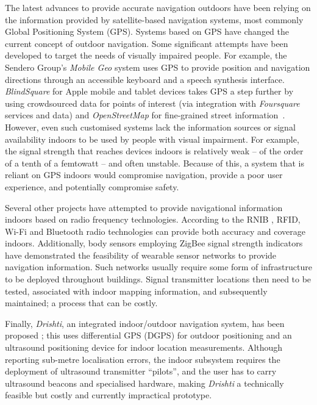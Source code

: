 The latest advances to provide accurate navigation outdoors have been relying on the information provided by satellite-based navigation systems, most commonly Global Positioning System (GPS). Systems based on GPS have changed the current concept of outdoor navigation. Some significant attempts have been developed to target the needs of visually impaired people. For example, the Sendero Group's  \textit{Mobile Geo} \citep{senderoSeeingEye} system uses GPS to provide position and navigation directions through an accessible keyboard and a speech synthesis interface. \textit{BlindSquare} for Apple mobile and tablet devices takes GPS a step further by using crowdsourced data for points of interest (via integration with \textit{Foursquare} services and data) and \textit{OpenStreetMap} for fine-grained street information~\citep{blindSquare}. However, even such customised systems lack the information sources or signal availability indoors to be used by people with visual impairment. For example, the signal strength that reaches devices indoors is relatively weak -- of the order of a tenth of a femtowatt \citep{warner2003gps} -- and often unstable.  Because of this, a system that is reliant on GPS indoors would compromise navigation, provide a poor user experience, and potentially compromise safety.

Several other projects have attempted to provide navigational information indoors based on radio frequency technologies. According to the RNIB \citep{Worsfold2010}, RFID, Wi-Fi and Bluetooth radio technologies can provide both accuracy and coverage indoors. Additionally, body sensors employing ZigBee signal strength indicators \citep{dong2012mapping} have demonstrated the feasibility of wearable sensor networks to provide navigation information. Such networks usually require some form of infrastructure to be deployed throughout buildings. Signal transmitter locations then need to be tested, associated with indoor mapping information, and subsequently maintained; a process that can be costly.

Finally, \textit{Drishti}, an integrated indoor/outdoor navigation system, has been proposed \citep{ran2004drishti}; this uses differential GPS (DGPS) for outdoor positioning and an ultrasound positioning device for indoor location measurements. Although reporting sub\--me\-tre localisation errors, the indoor subsystem requires the deployment of ultrasound transmitter ``pilots'', and the user has to carry ultrasound beacons and specialised hardware, making  \textit{Drishti} a technically feasible but costly and currently impractical prototype.

